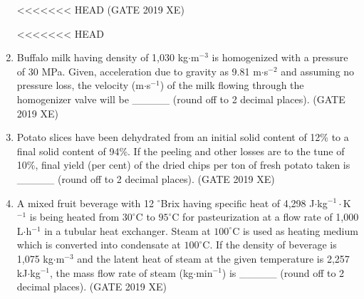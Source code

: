 \documentclass[journal,12pt,onecolumn]{IEEEtran}
\begin{document}
\begin{enumerate}


<<<<<<< HEAD
\hfill{(GATE 2019 XE)} \\
\begin{multicols}{2}
<<<<<<< HEAD
\end{multicols}


\item Buffalo milk having density of 1,030 kg$\cdot$m$^{-3}$ is homogenized with a pressure of 30 MPa. Given, acceleration due to gravity as 9.81 m$\cdot$s$^{-2}$ and assuming no pressure loss, the velocity (m$\cdot$s$^{-1}$) of the milk flowing through the homogenizer valve will be \_\_\_\_\_ (round off to 2 decimal places).
\hfill{(GATE 2019 XE)} \\


\item Potato slices have been dehydrated from an initial solid content of 12\% to a final solid content of 94\%. If the peeling and other losses are to the tune of 10\%, final yield (per cent) of the dried chips per ton of fresh potato taken is \_\_\_\_\_ (round off to 2 decimal places).
\hfill{(GATE 2019 XE)} \\


\item A mixed fruit beverage with 12 $^\circ$Brix having specific heat of 4,298 J$\cdot$kg$^{-1}\cdot$K$^{-1}$ is being heated from $30^\circ$C to $95^\circ$C for pasteurization at a flow rate of 1,000 L$\cdot$h$^{-1}$ in a tubular heat exchanger. Steam at $100^\circ$C is used as heating medium which is converted into condensate at $100^\circ$C. If the density of beverage is 1,075 kg$\cdot$m$^{-3}$ and the latent heat of steam at the given temperature is 2,257 kJ$\cdot$kg$^{-1}$, the mass flow rate of steam (kg$\cdot$min$^{-1}$) is \_\_\_\_\_ (round off to 2 decimal places).
\hfill{(GATE 2019 XE)} \\



\end{enumerate}
\end{document}
